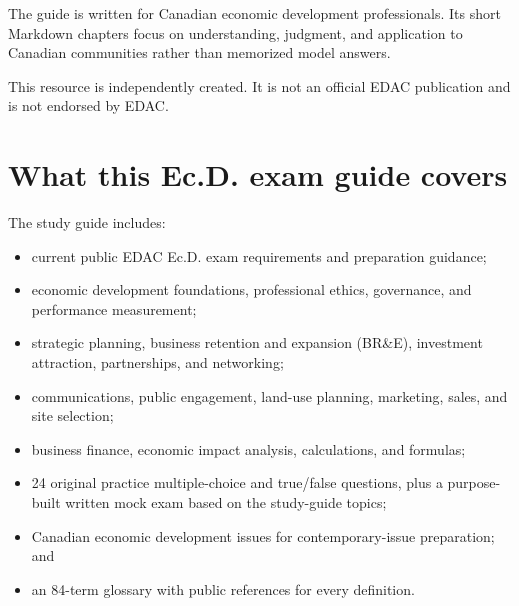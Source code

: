\documentclass[11pt,letterpaper,oneside,openany]{book}
\begin{document}
The guide is written for Canadian economic development professionals. Its short Markdown chapters focus on understanding, judgment, and application to Canadian communities rather than memorized model answers.


\begin{guidequote}
This resource is independently created. It is not an official EDAC publication and is not endorsed by EDAC.

\end{guidequote}



\section[What this Ec.D. exam guide covers]{What this Ec.D. exam guide covers}
The study guide includes:


\begin{itemize}
\item current public EDAC Ec.D. exam requirements and preparation guidance;
\item economic development foundations, professional ethics, governance, and performance measurement;
\item strategic planning, business retention and expansion (BR\&E), investment attraction, partnerships, and networking;
\item communications, public engagement, land-use planning, marketing, sales, and site selection;
\item business finance, economic impact analysis, calculations, and formulas;
\item 24 original practice multiple-choice and true/false questions, plus a purpose-built written mock exam based on the study-guide topics;
\item Canadian economic development issues for contemporary-issue preparation; and
\item an 84-term glossary with public references for every definition.
\end{itemize}
\end{document}
